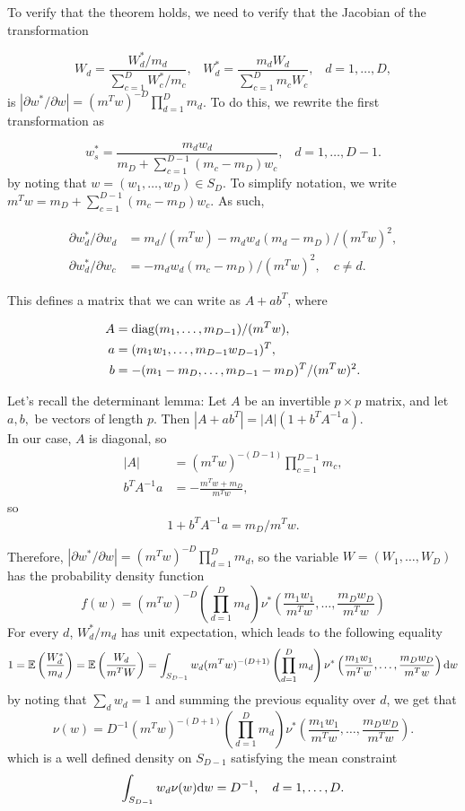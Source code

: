To verify that the theorem holds, we need to verify that the Jacobian of the transformation

$$
W_d = \dfrac{W^*_d/m_d}{\sum_{c=1}^{D}W_c^*/m_c},\hspace{10pt}
W_d^* = \frac{m_dW_d}{\sum_{c=1}^{D}m_cW_c},\hspace{10pt}
d=1,\ldots,D,
$$
is $|\partial w^*/\partial w | = (m^Tw)^{-D} \prod_{d=1}^{D}m_d$.
To do this, we rewrite the first transformation as

$$
w_s^* = \frac{m_dw_d}{m_D+\sum_{c=1}^{D-1}(m_c - m_D)w_c}, \hspace{10pt}
d=1,\ldots,D-1.
$$
by noting that $w=(w_1,\ldots,w_D) \in S_D$. To simplify notation, we write
$m^Tw = m_D + \sum_{c=1}^{D-1}(m_c - m_D)w_c$. As such,

\begin{align*}
\partial w_d^*/\partial w_d &= m_d/(m^Tw) - m_dw_d(m_d - m_D)/(m^Tw)^2 , \\
\partial w_d^*/\partial w_c &= - m_dw_d (m_c - m_D)/(m^Tw)^2, \quad c\neq d.
\end{align*}

This defines a matrix that we can write as $A + ab^T$, where

\begin{align*}
A &= {\rm diag}(m_1,\ldots,m_{D-1})/(m^Tw) , \\
a &= (m_1w_1,\ldots,m_{D-1}w_{D-1})^T , \\
b &= -(m_1 - m_D,\ldots,m_{D-1} - m_D)^T/(m^Tw)^2.
\end{align*}


Let's recall the determinant lemma:
Let $A$ be an invertible $ p \times p $ matrix, and let $a,b,$ be vectors of length $p$.
Then $|A + ab^T| = |A|(1 + b^TA^{-1}a)$. \\

In our case, $A$ is diagonal, so
\begin{align*}
|A| &= (m^Tw)^{-(D-1)} \prod_{c=1}^{D-1}m_c , \\
b^TA^{-1}a &= -\frac{m^Tw + m_D}{m^Tw},
\end{align*}
so 
$$1 + b^TA^{-1}a = m_D/m^Tw.$$

Therefore, $|\partial w^*/\partial w| = (m^Tw)^{-D} \prod_{d=1}^Dm_d$, so the variable $W=(W_1,\ldots,W_D)$ has the probability density function
$$
f(w) = (m^Tw)^{-D} \left(\prod_{d=1}^D m_d\right) \nu^* \left(\frac{m_1w_1}{m^Tw},\ldots,\frac{m_Dw_D}{m^Tw}\right)
$$
For every $d$, $W_d^*/m_d$ has unit expectation, which leads to the following equality
$$
1 = \mathbb{E} \left( \frac{W_d^*}{m_d} \right) = \mathbb{E} \left( \frac{W_d}{m^TW} \right)
= \int_{S_{D-1}} w_d (m^Tw)^{-(D+1)} \left(\prod^D_{d=1} m_d \right) \nu^* \left(\frac{m_1w_1}{m^Tw},\ldots,\frac{m_Dw_D}{m^Tw}\right) {\rm d}w
$$
by noting that $\sum_d w_d = 1$ and summing the previous equality over $d$, we get that
$$
\nu (w) = D^{-1}(m^Tw)^{-(D+1)} \left(\prod_{d=1}^D m_d\right) \nu^* \left(\frac{m_1w_1}{m^Tw},\ldots,\frac{m_Dw_D}{m^Tw}\right).
$$
which is a well defined density on $S_{D-1}$ satisfying the mean constraint
$$
\int_{S_{D-1}} w_d \nu (w) {\rm d}w = D^{-1}, \quad d=1,\ldots,D.
$$


